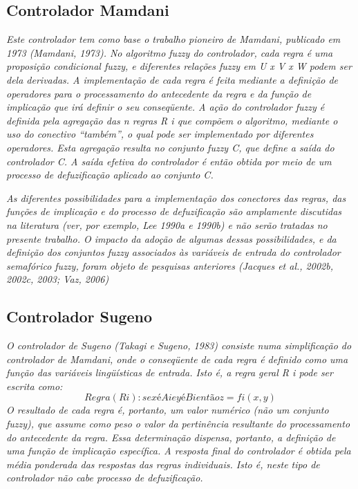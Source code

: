 \documentclass[
	twoside,				%
	twocolumn,				%
	english,				%
	brazil,					%
]{article}
\begin{document}
\subsection{Controlador Mamdani}

\textit{Este controlador tem como base o trabalho pioneiro de Mamdani, publicado em 1973 (Mamdani, 1973). No algoritmo fuzzy do controlador, cada regra é uma proposição condicional fuzzy, e diferentes relações fuzzy em U x V x W podem ser dela derivadas.
A implementação de cada regra é feita mediante a definição de operadores para o processamento do antecedente da regra e da função de implicação que irá definir o seu conseqüente. A ação do controlador fuzzy é definida pela agregação das n regras R i que compõem o algoritmo, mediante o uso do conectivo “também”, o qual pode ser implementado por diferentes operadores. Esta agregação resulta no conjunto fuzzy C, que define a saída do controlador C. A saída efetiva do controlador é então obtida por meio de um processo de defuzificação aplicado ao conjunto C.}

\textit{As diferentes possibilidades para a implementação dos conectores das regras, das funções de implicação e do processo de defuzificação são amplamente discutidas na literatura (ver, por exemplo, Lee 1990a e 1990b) e não serão tratadas no presente trabalho. O impacto da adoção de algumas dessas possibilidades, e da definição dos conjuntos fuzzy associados às variáveis de entrada do controlador semafórico fuzzy, foram objeto de pesquisas anteriores (Jacques et al., 2002b, 2002c, 2003; Vaz, 2006)}

\subsection{Controlador Sugeno}

\textit{O controlador de Sugeno (Takagi e Sugeno, 1983) consiste numa simplificação do controlador de Mamdani, onde o conseqüente de cada regra é definido como uma função das variáveis lingüísticas de entrada. Isto é, a regra geral R i pode ser escrita como:}
$$
Regra (R i ): se x é A i e y é B i então z = f i (x, y)
$$
\textit{O resultado de cada regra é, portanto, um valor numérico (não um conjunto fuzzy), que assume como peso o valor da pertinência resultante do processamento do antecedente da regra. Essa determinação dispensa, portanto, a definição de uma função de implicação específica. A resposta final do controlador é obtida pela média ponderada das respostas das regras individuais. Isto é, neste tipo de controlador não cabe processo de defuzificação.}
\end{document}
